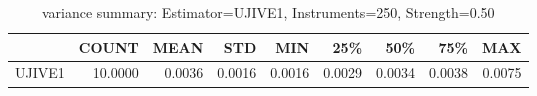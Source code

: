 \begin{table}[ht]
\centering
\caption{variance summary: Estimator=UJIVE1, Instruments=250, Strength=0.50}
\begin{tabular}{lrrrrrrrr}
\toprule
 & COUNT & MEAN & STD & MIN & 25\% & 50\% & 75\% & MAX \\
\midrule
UJIVE1 & 10.0000 & 0.0036 & 0.0016 & 0.0016 & 0.0029 & 0.0034 & 0.0038 & 0.0075 \\
\bottomrule
\end{tabular}
\end{table}

